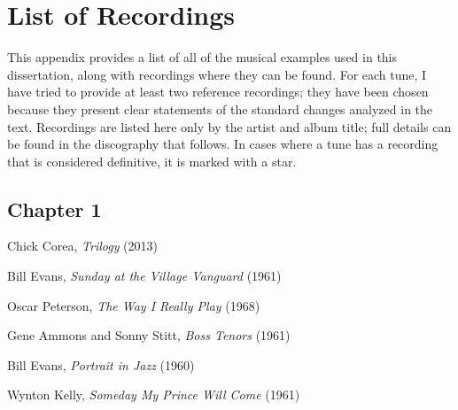 \chapter{List of Recordings}

\singlespacing

%
%
This appendix provides a list of all of the musical examples used in this
dissertation, along with recordings where they can be found. For each tune, I
have tried to provide at least two reference recordings; they have been
chosen because they present clear statements of the standard changes analyzed
in the text. Recordings are listed here only by the artist and album title;
full details can be found in the discography that follows. In cases where a
tune has a recording that is considered definitive, it is marked with a star.

\section*{Chapter 1}

\vspace{-1em}

\begin{compactitem}
    \item Chick Corea, \emph{Trilogy} (2013)
    \item Bill Evans, \emph{Sunday at the Village Vanguard} (1961)
    \item Oscar Peterson, \emph{The Way I Really Play} (1968)
\end{compactitem}
\nocite{corea:trilogy,evans:sunday,peterson:reallyplay}


\begin{compactitem}
    \item Gene Ammons and Sonny Stitt, \emph{Boss Tenors} (1961)
    \item Bill Evans, \emph{Portrait in Jazz} (1960)
    \item Wynton Kelly, \emph{Someday My Prince Will Come} (1961)
\end{compactitem}
\nocite{ammons:stitt,evans:portrait,kelly:someday}

